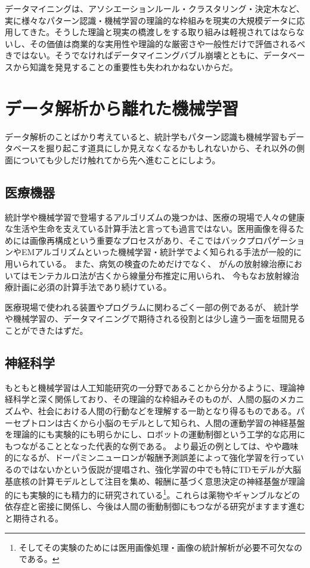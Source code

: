 データマイニングは、アソシエーションルール・クラスタリング・決定木など、実に様々なパターン認識・機械学習の理論的な枠組みを現実の大規模データに応用してきた。そうした理論と現実の橋渡しをする取り組みは軽視されてはならないし、その価値は商業的な実用性や理論的な厳密さや一般性だけで評価されるべきではない。そうでなければデータマイニングバブル崩壊とともに、データベースから知識を発見することの重要性も失われかねないからだ。

\section{データ解析から離れた機械学習}
データ解析のことばかり考えていると、統計学もパターン認識も機械学習もデータベースを掘り起こす道具にしか見えなくなるかもしれないから、それ以外の側面についても少しだけ触れてから先へ進むことにしよう。
\subsection{医療機器}
統計学や機械学習で登場するアルゴリズムの幾つかは、医療の現場で人々の健康な生活や生命を支えている計算手法と言っても過言ではない。医用画像を得るためには画像再構成という重要なプロセスがあり、そこではバックプロパゲーションやEMアルゴリズムといった機械学習・統計学でよく知られる手法が一般的に用いられている。
また、病気の検査のためだけでなく、
がんの放射線治療においてはモンテカルロ法が古くから線量分布推定に用いられ、
今もなお放射線治療計画に必須の計算手法であり続けている。

医療現場で使われる装置やプログラムに関わるごく一部の例であるが、
統計学や機械学習の、データマイニングで期待される役割とは少し違う一面を垣間見ることができたはずだ。

\subsection{神経科学}
もともと機械学習は人工知能研究の一分野であることから分かるように、理論神経科学と深く関係しており、その理論的な枠組みそのものが、人間の脳のメカニズムや、社会における人間の行動などを理解する一助となり得るものである。パーセプトロンは古くから小脳のモデルとして知られ、人間の運動学習の神経基盤を理論的にも実験的にも明らかにし、ロボットの運動制御という工学的な応用にもつながることとなった代表的な例である。
より最近の例としては、やや趣味的になるが、ドーパミンニューロンが報酬予測誤差によって強化学習を行っているのではないかという仮説が提唱され、強化学習の中でも特にTDモデルが大脳基底核の計算モデルとして注目を集め、報酬に基づく意思決定の神経基盤が理論的にも実験的にも精力的に研究されている\footnote{そしてその実験のためには医用画像処理・画像の統計解析が必要不可欠なのである。}。これらは薬物やギャンブルなどの依存症と密接に関係し、今後は人間の衝動制御にもつながる研究がますます進むと期待される。

